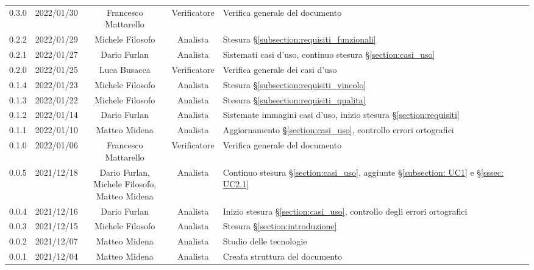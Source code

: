 \begin{center}
\begin{longtable}[c]{c | c | c | c | p{5cm}}
		0.3.0 & 2022/01/30 & Francesco Mattarello & Verificatore & Verifica generale del documento\\
		0.2.2 & 2022/01/29 & Michele Filosofo & Analista & Stesura §\ref{subsection:requisiti_funzionali}\\
		0.2.1 & 2022/01/27 & Dario Furlan & Analista & Sistemati casi d'uso, continuo stesura §\ref{section:casi_uso}\\
		0.2.0 & 2022/01/25 & Luca Busacca & Verificatore & Verifica generale dei casi d'uso\\
		0.1.4 & 2022/01/23 & Michele Filosofo & Analista & Stesura §\ref{subsection:requisiti_vincolo}\\
		0.1.3 & 2022/01/22 & Michele Filosofo & Analista & Stesura §\ref{subsection:requisiti_qualita}\\
		0.1.2 & 2022/01/14 & Dario Furlan & Analista & Sistemate immagini casi d'uso, inizio stesura §\ref{section:requisiti}\\
		0.1.1 & 2022/01/10 & Matteo Midena & Analista & Aggiornamento §\ref{section:casi_uso}, controllo errori ortografici\\
		0.1.0 & 2022/01/06 & Francesco Mattarello & Verificatore & Verifica generale del documento\\
		0.0.5 & 2021/12/18 & \Shortunderstack{Dario Furlan,\\Michele Filosofo,\\Matteo Midena\\} & Analista & Continuo stesura §\ref{section:casi_uso}, aggiunte §\ref{subsection: UC1} e §\ref{sssec: UC2.1}\\
		0.0.4 & 2021/12/16 & Dario Furlan & Analista & Inizio stesura §\ref{section:casi_uso}, controllo degli errori ortografici\\
		0.0.3 & 2021/12/15 & Michele Filosofo & Analista & Stesura §\ref{section:introduzione}\\
		0.0.2 & 2021/12/07 & Matteo Midena & Analista & Studio delle tecnologie\\
		0.0.1 & 2021/12/04 & Matteo Midena & Analista & Creata struttura del documento\\
	\end{longtable}
\end{center}